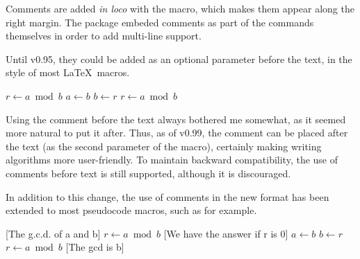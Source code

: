 \documentclass[a4paper, 11pt]{article}
\begin{document}
Comments are added \textit{in loco} with the  macro, which makes them appear along the right margin. The  package embeded comments as part of the commands themselves in order to add multi-line support.

Until  v0.95, they could be added as an optional parameter before the text, in the style of most \LaTeX\ macros.

\begingroup
{}
\begin{PDExample}
    \begin{algorithmic}[1]
            \State $r\gets a\bmod b$
                \State $a\gets b$
                \State $b\gets r$
                \State $r\gets a\bmod b$
            \EndWhile
        \EndProcedure
    \end{algorithmic}
\end{PDExample}
\endgroup

Using the comment before the text always bothered me somewhat, as it seemed more natural to put it after.
%
Thus, as of v0.99, the comment can be placed after the text (as the second parameter of the macro), certainly making writing algorithms more user-friendly. To maintain backward compatibility, the use of comments before text is still supported, although it is discouraged.

%
In addition to this change, the use of comments in the new format has been extended to most pseudocode macros, such as  for example.

\begingroup
{}
\begin{PDExample}
    \begin{algorithmic}[1]
        [The g.c.d. of a and b]  %
            \State $r\gets a\bmod b$
            [We have the answer if r is 0]  %
                \State $a\gets b$
                \State $b\gets r$
                \State $r\gets a\bmod b$
            [The gcd is b]  %
        \EndProcedure
    \end{algorithmic}
\end{PDExample}
\endgroup
\end{document}
